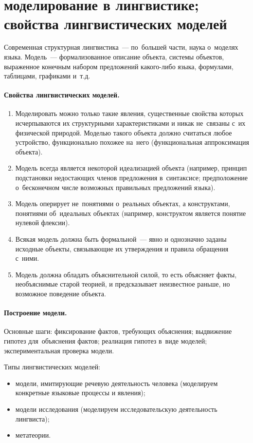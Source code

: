 \documentclass[12pt]{article}
\theoremstyle{definition}
\theoremstyle{remark}
\numberwithin{equation}{section}
\begin{document}
\section{моделирование в лингвистике;  свойства лингвистических
моделей}
Современная структурная лингвистика~--- по~большей части, наука
о~моделях языка. Модель~--- формализованное описание объекта,
системы объектов, выраженное конечным набором предложений какого-либо
языка, формулами, таблицами, графиками и~т.д.

\paragraph{Свойства лингвистических моделей.}
\begin{enumerate}
	\item Моделировать можно только такие явления, существенные
    свойства которых исчерпываются их структурными характеристиками
    и никак не~связаны с~их физической природой. Моделью такого объекта
    должно считаться любое устройство, функционально похожее на~него
    (функциональная аппроксимация объекта).
	\item Модель всегда является некоторой идеализацией объекта
    (например, принцип подстановки недостающих членов предложения
    в~синтаксисе; предположение о~бесконечном числе возможных правильных
    предложений языка).
	\item Модель оперирует не~понятиями о~реальных объектах, а конструктами,
    понятиями об~идеальных объектах (например, конструктом является
    понятие нулевой флексии).
	\item Всякая модель должна быть формальной~--- явно и однозначно
    заданы исходные объекты, связывающие их утверждения и правила
    обращения с~ними.
	\item Модель должна обладать объяснительной силой, то есть объясняет
    факты, необъяснимые старой теорией, и предсказывает неизвестное раньше,
    но возможное поведение объекта.
\end{enumerate}

\paragraph{Построение модели.}
Основные шаги: фиксирование фактов, требующих объяснения; выдвижение гипотез
для~объяснения фактов; реалиация гипотез в~виде моделей; экспериментальная
проверка модели.

Типы лингвистических моделей:
\begin{itemize}
	\item модели, имитирующие речевую деятельность человека (моделируем
    конкретные языковые процессы и явления);
	\item модели исследования (моделируем исследовательскую деятельность
    лингвиста);
	\item метатеории.
\end{itemize}
\end{document}
